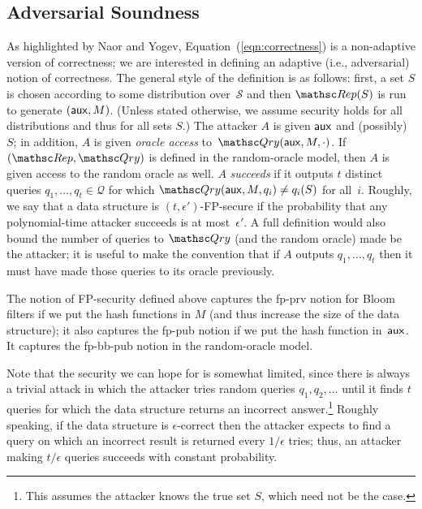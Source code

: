 \subsection{Adversarial Soundness}
As highlighted by Naor and Yogev,
Equation~(\ref{eqn:correctness}) is a non-adaptive version of correctness;
we are interested in defining an adaptive (i.e., adversarial) notion
of correctness. 
The general style of the definition is as follows:
first, a set $S$ is chosen according to some distribution over~$\mathcal{S}$ and then
$\Rep(S)$ is run to generate $({\sf aux}, M)$. (Unless stated otherwise, we assume
security holds for all distributions and thus for all sets $S$.)
The attacker $A$ is given ${\sf aux}$ and (possibly)~$S$;
in addition, $A$ is given \emph{oracle access} to~$\Qry(\aux, M, \cdot)$.
If $(\Rep, \Qry)$ is defined in the random-oracle model, then
$A$ is given access to the random oracle as well.
$A$ \emph{succeeds} if it outputs $t$ distinct queries $q_1, \ldots, q_t \in \mathcal{Q}$ for which
$\Qry(\aux, M, q_i) \neq q_i(S)$ for all~$i$.
Roughly, we say that a data structure is $(t,\epsilon')$-FP-secure if the probability that
any polynomial-time attacker succeeds is at most~$\epsilon'$. A full definition
would also bound the number of queries to $\Qry$ (and the random oracle) made
be the attacker; it is useful to make the convention that if $A$ outputs
$q_1, \ldots, q_t$ then it must have made those queries to its oracle previously.

The notion of FP-security defined above captures the fp-prv notion for Bloom filters
if we put the hash
functions in $M$ (and thus increase the size of the data structure); it also captures the fp-pub
notion if we put the hash function in~${\sf aux}$.   It captures the fp-bb-pub notion in the
random-oracle model.

Note that the security we can hope for is somewhat limited, since there
is always a trivial attack in which
the attacker tries random queries $q_1, q_2, \ldots$ until it finds $t$ queries for which the
data structure returns an incorrect answer.\footnote{This assumes the attacker
knows the true set $S$, which need not be the case.} Roughly speaking,
if the data structure is $\epsilon$-correct then the attacker expects to find a query on which
an incorrect result is returned
every $1/\epsilon$ tries; thus, an
attacker making $t/\epsilon$ queries succeeds with constant probability.

